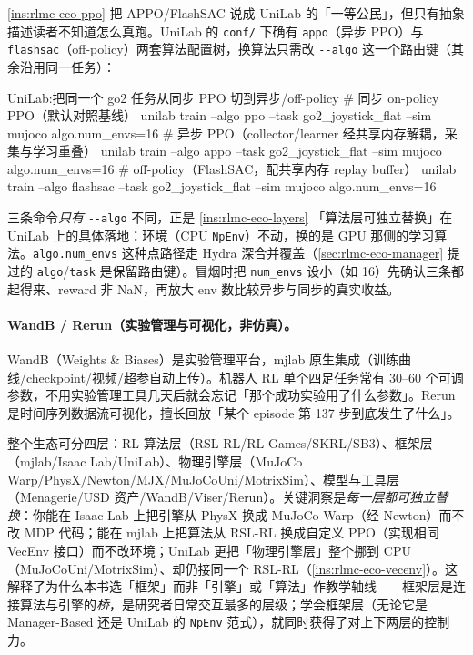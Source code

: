 \begin{note}
\cref{ins:rlmc-eco-ppo} 把 APPO/FlashSAC 说成 UniLab 的「一等公民」，但只有抽象描述读者不知道怎么真跑。UniLab 的 \verb|conf/| 下确有 \verb|appo|（异步 PPO）与 \verb|flashsac|（off-policy）两套算法配置树，换算法只需改 \verb|--algo| 这一个路由键（其余沿用同一任务）：
\begin{codebox}[bash]{UniLab:把同一个 go2 任务从同步 PPO 切到异步/off-policy}
# 同步 on-policy PPO（默认对照基线）
unilab train --algo ppo     --task go2_joystick_flat --sim mujoco algo.num_envs=16
# 异步 PPO（collector/learner 经共享内存解耦，采集与学习重叠）
unilab train --algo appo    --task go2_joystick_flat --sim mujoco algo.num_envs=16
# off-policy（FlashSAC，配共享内存 replay buffer）
unilab train --algo flashsac --task go2_joystick_flat --sim mujoco algo.num_envs=16
\end{codebox}
三条命令\emph{只有} \verb|--algo| 不同，正是 \cref{ins:rlmc-eco-layers} 「算法层可独立替换」在 UniLab 上的具体落地：环境（CPU \verb|NpEnv|）不动，换的是 GPU 那侧的学习算法。\verb|algo.num_envs| 这种点路径走 Hydra 深合并覆盖（\cref{sec:rlmc-eco-manager} 提过的 \verb|algo|/\allowbreak\verb|task| 是保留路由键）。冒烟时把 \verb|num_envs| 设小（如 16）先确认三条都起得来、reward 非 NaN，再放大 env 数比较异步与同步的真实收益。
\end{note}

\paragraph{WandB / Rerun（实验管理与可视化，非仿真）。}WandB（Weights \& Biases）是实验管理平台，mjlab 原生集成（训练曲线/checkpoint/视频/超参自动上传）。机器人 RL 单个四足任务常有 $30$--$60$ 个可调参数，不用实验管理工具几天后就会忘记「那个成功实验用了什么参数」。Rerun 是时间序列数据流可视化，擅长回放「某个 episode 第 137 步到底发生了什么」。

\begin{insight}[框架-引擎-工具是可独立替换的分层]\label{ins:rlmc-eco-layers}
整个生态可分四层：RL 算法层（RSL-RL/RL Games/SKRL/SB3）、框架层（mjlab/Isaac Lab/UniLab）、物理引擎层（MuJoCo Warp/PhysX/Newton/MJX/MuJoCoUni/MotrixSim）、模型与工具层（Menagerie/USD 资产/WandB/Viser/Rerun）。关键洞察是\emph{每一层都可独立替换}：你能在 Isaac Lab 上把引擎从 PhysX 换成 MuJoCo Warp（经 Newton）而不改 MDP 代码；能在 mjlab 上把算法从 RSL-RL 换成自定义 PPO（实现相同 VecEnv 接口）而不改环境；UniLab 更把「物理引擎层」整个挪到 CPU（MuJoCoUni/MotrixSim）、却仍接同一个 RSL-RL（\cref{ins:rlmc-eco-vecenv}）。这解释了为什么本书选「框架」而非「引擎」或「算法」作教学轴线——框架层是连接算法与引擎的\emph{桥}，是研究者日常交互最多的层级；学会框架层（无论它是 Manager-Based 还是 UniLab 的 \verb|NpEnv| 范式），就同时获得了对上下两层的控制力。
\end{insight}

